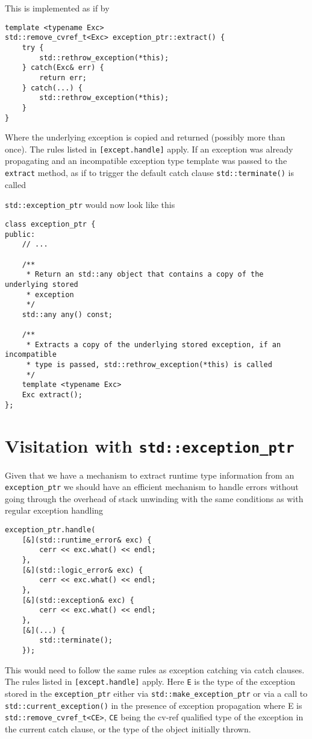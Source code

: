 \documentclass{article}
\begin{document}
This is implemented as if by
\begin{lstlisting}
template <typename Exc>
std::remove_cvref_t<Exc> exception_ptr::extract() {
    try {
        std::rethrow_exception(*this);
    } catch(Exc& err) {
        return err;
    } catch(...) {
        std::rethrow_exception(*this);
    }
}
\end{lstlisting}

Where the underlying exception is copied and returned (possibly more than
once).  The rules listed in \texttt{[except.handle]} apply.  If an exception
was already propagating and an incompatible exception type template was passed
to the \texttt{extract} method, as if to trigger the default catch clause
\texttt{std::terminate()} is called

\texttt{std::exception\_ptr} would now look like this
\begin{lstlisting}
class exception_ptr {
public:
    // ...

    /**
     * Return an std::any object that contains a copy of the underlying stored
     * exception
     */
    std::any any() const;

    /**
     * Extracts a copy of the underlying stored exception, if an incompatible
     * type is passed, std::rethrow_exception(*this) is called
     */
    template <typename Exc>
    Exc extract();
};
\end{lstlisting}

\section{Visitation with \texttt{std::exception\_ptr}}
Given that we have a mechanism to extract runtime type information from an
\texttt{exception\_ptr} we should have an efficient mechanism to handle errors
without going through the overhead of stack unwinding with the same conditions
as with regular exception handling
\begin{lstlisting}
exception_ptr.handle(
    [&](std::runtime_error& exc) {
        cerr << exc.what() << endl;
    },
    [&](std::logic_error& exc) {
        cerr << exc.what() << endl;
    },
    [&](std::exception& exc) {
        cerr << exc.what() << endl;
    },
    [&](...) {
        std::terminate();
    });
\end{lstlisting}

This would need to follow the same rules as exception catching via catch
clauses.  The rules listed in \texttt{[except.handle]} apply.  Here \texttt{E}
is the type of the exception stored in the \texttt{exception\_ptr} either via
\texttt{std::make\_exception\_ptr} or via a call to
\texttt{std::current\_exception()} in the presence of exception propagation
where E is \texttt{std::remove\_cvref\_t<CE>}, \texttt{CE} being the cv-ref
qualified type of the exception in the current catch clause, or the type of
the object initially thrown.
\end{document}
